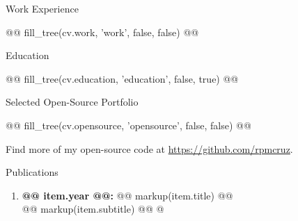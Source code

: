 \documentclass[11pt]{article}
\begin{document}
\begin{minipage}[t]{0.55\textwidth}
\setlength{\parskip}{1em}
\centerline{\sc\large Work Experience}

@@ fill_tree(cv.work, 'work', false, false) @@
\end{minipage}
%
\hfill\raisebox{-0.47\textheight}{\rule{0.5pt}{0.48\textheight}}\hfill%
%
\begin{minipage}[t]{0.40\textwidth}
\setlength{\parskip}{1em}
\centerline{\sc\large Education}

@@ fill_tree(cv.education, 'education', false, true) @@
\end{minipage}


\newpage
\centerline{\sc\large Selected Open-Source Portfolio}

\begin{multicols}{2}
\setlength{\columnseprule}{0.4pt}
@@ fill_tree(cv.opensource, 'opensource', false, false) @@
\end{multicols}

Find more of my open-source code at \href{https://github.com/rpmcruz?tab=repositories}{https://github.com/rpmcruz}.


\newpage
\centerline{\sc\large Publications}

\begin{enumerate}
\itemsep0em
@%
\item \textbf{@@ item.year @@:} @@ markup(item.title) @@\\
@@ markup(item.subtitle) @@
@%
\end{enumerate}
\end{document}
